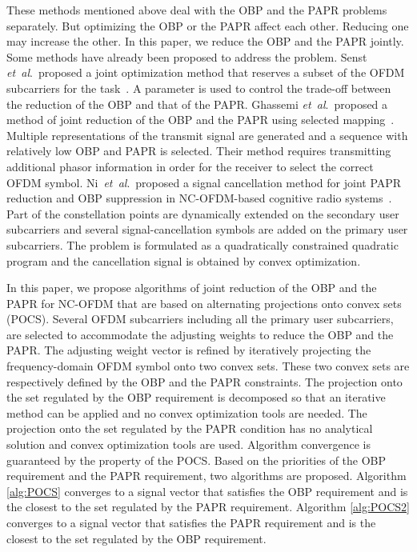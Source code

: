 \documentclass[paper]{ieice}
\begin{document}
These methods mentioned above deal with the OBP and the PAPR problems separately. But optimizing the OBP or the PAPR affect each other. Reducing one may increase the other. In this paper, we reduce the OBP and the PAPR jointly. Some methods have already been proposed to address the problem. Senst \emph{et~al}.~proposed a joint optimization method that reserves a subset of the OFDM subcarriers for the task~\cite{4411634}.  A parameter is used to control the trade-off between the reduction of the OBP and that of the PAPR.  Ghassemi \emph{et~al}.~proposed a method of joint reduction of the OBP and the PAPR using selected mapping~\cite{5594133}.  Multiple representations of the transmit signal are generated and a sequence with relatively low OBP and PAPR is selected.  Their method requires transmitting additional phasor information in order for the receiver to select the correct OFDM symbol. 
Ni~\emph{et~al}.~proposed a signal cancellation method for joint PAPR reduction and OBP suppression in NC-OFDM-based cognitive radio systems~\cite{ni2015joint}.  Part of the constellation points are dynamically extended on the secondary user subcarriers and several signal-cancellation symbols are added on the primary user subcarriers.  The problem is formulated as a quadratically constrained quadratic program and the cancellation signal is obtained by convex optimization.

In this paper, we propose algorithms of joint reduction of the OBP and the PAPR for NC-OFDM that are based on alternating projections onto convex sets (POCS).  Several OFDM subcarriers including all the primary user subcarriers, are selected to accommodate the adjusting weights to reduce the OBP and the PAPR.  The adjusting weight vector is refined by iteratively projecting the frequency-domain OFDM symbol onto two convex sets.  These two convex sets are respectively defined by the OBP and the PAPR constraints.  The projection onto the set regulated by the OBP requirement is decomposed so that an iterative method can be applied and no convex optimization tools are needed.  The projection onto the set regulated by the PAPR condition has no analytical solution and convex optimization tools are used. Algorithm convergence is guaranteed by the property of the POCS. Based on the priorities of the OBP requirement and the PAPR requirement, two algorithms are proposed.  Algorithm \ref{alg:POCS} converges to a signal vector that satisfies the OBP requirement and is the closest to the set regulated by the PAPR requirement. Algorithm \ref{alg:POCS2} converges to a signal vector that satisfies the PAPR requirement and is the closest to the set regulated by the OBP requirement.   
\end{document}

